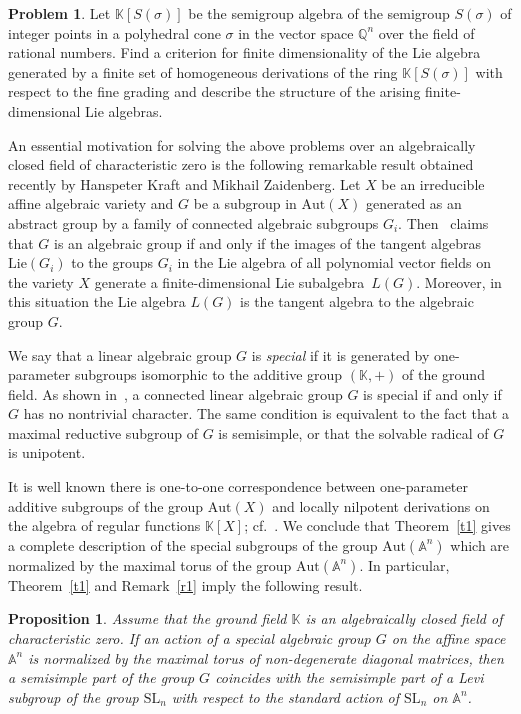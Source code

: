 \documentclass[a4paper, 12pt,oneside,reqno]{amsart}
\numberwithin{equation}{section}
\newtheorem{proposition}[theorem]{Proposition}
\theoremstyle{definition}
\newtheorem{problem}{Problem}
\begin{document}
{\begin{problem}
Let $\mathbb{K}[S(\sigma)]$ be the semigroup algebra of the semigroup $S(\sigma)$ of integer points in a polyhedral cone $\sigma$ in the vector space $\mathbb{Q}^n$ over the field of rational numbers. 
Find a criterion for finite dimensionality of the Lie algebra generated by a finite set of homogeneous derivations of the ring $\mathbb{K}[S(\sigma)]$ with respect to the fine grading and describe the structure of the arising finite-dimensional Lie algebras.  
\end{problem}

An essential motivation for solving the above problems over an algebraically closed field of characteristic zero is the following remarkable result obtained recently by Hanspeter Kraft and
Mikhail Zaidenberg. Let $X$ be an irreducible affine algebraic variety and $G$ be a subgroup in $\mathrm{Aut}(X)$ generated as an abstract group by a family of connected algebraic subgroups $G_i$. Then~\cite[Theorem~A]{KZ} claims that $G$ is an algebraic group if and only if the images of the tangent algebras $\mathrm{Lie}(G_i)$ to the groups $G_i$ in the Lie algebra of all polynomial vector fields on the variety $X$ generate a finite-dimensional Lie subalgebra~$L(G)$. Moreover, in this situation the Lie algebra $L(G)$ is the tangent algebra to the algebraic group $G$.

We say that a linear algebraic group $G$ is \emph{special} if it is generated by one-parameter subgroups isomorphic to the additive group $(\mathbb{K},+)$ of the ground field. As shown in~\cite[Lemma~1.1]{Po}, a connected linear algebraic group $G$ is special if and only if $G$ has no nontrivial character. The same condition is equivalent to the fact that a maximal reductive subgroup of $G$ is semisimple, or that the solvable radical of $G$ is unipotent. 

It is well known there is one-to-one correspondence between one-parameter additive subgroups of the group $\mathrm{Aut}(X)$ and locally nilpotent derivations on the algebra of regular functions $\mathbb{K}[X]$; cf.~\cite[Section~1.5]{Fr}. We conclude that Theorem~\ref{t1} gives a complete description of the special subgroups of the group $\mathrm{Aut}(\mathbb{A}^n)$ which are normalized by the maximal torus of the group $\mathrm{Aut}(\mathbb{A}^n)$.  In particular, Theorem~\ref{t1} and Remark~\ref{r1} imply the following result. 

\begin{proposition}
Assume that the ground field $\mathbb{K}$ is an algebraically closed field of characteristic zero. If an action of a special algebraic group $G$ on the affine space $\mathbb{A}^n$ is normalized by the maximal torus of non-degenerate diagonal matrices, then a semisimple part of the group $G$ coincides with the semisimple part of a Levi subgroup of the group $\text{SL}_n$ with respect to the standard action of $\text{SL}_n$ on $\mathbb{A}^n$.
\end{proposition}


}
\end{document}
